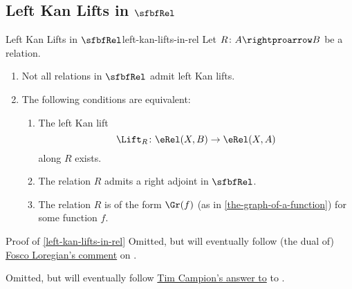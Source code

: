 \subsection{Left Kan Lifts in $\sfbfRel$}\label{subsection-left-kan-lifts-in-rel}
\begin{proposition}{Left Kan Lifts in $\sfbfRel$}{left-kan-lifts-in-rel}%
    Let $R\colon A\rightproarrow B$ be a relation.
    \begin{enumerate}
        \item\label{left-kan-lifts-in-rel-non-existence-of-all-left-kan-lifts-in-rel}Not all relations in $\sfbfRel$ admit left Kan lifts.
        \item\label{left-kan-lifts-in-rel-characterisation-of-relations-admitting-left-kan-lifts-along-them}The following conditions are equivalent:
            \begin{enumerate}
                \item The left Kan lift
                    \[
                        \Lift_{R}%
                        \colon%
                        \eRel(X,B)%
                        \to%
                        \eRel(X,A)%
                    \]%
                    along $R$ exists.
                \item The relation $R$ admits a right adjoint in $\sfbfRel$.
                \item The relation $R$ is of the form $\Gr(f)$ (as in \cref{the-graph-of-a-function}) for some function $f$.
            \end{enumerate}
    \end{enumerate}
\end{proposition}
\begin{Proof}{Proof of \cref{left-kan-lifts-in-rel}}%
    Omitted, but will eventually follow (the dual of) \href{https://mathoverflow.net/questions/460656/existence-and-characterisations-of-left-kan-lifts-and-liftings-in-the-bicat#comment1194691_460656}{Fosco Loregian's comment} on \cite{MO460656}.

    Omitted, but will eventually follow \href{https://mathoverflow.net/a/460693}{Tim Campion's answer to} to \cite{MO460656}.
\end{Proof}
